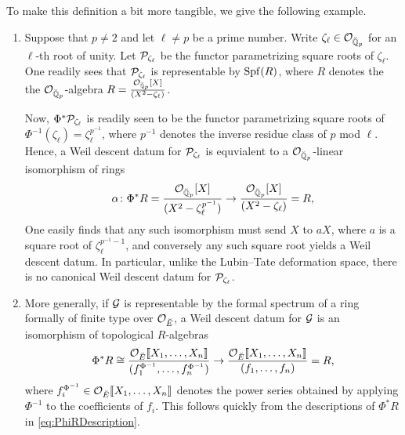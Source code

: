 \documentclass[../main.tex]{subfiles}
\begin{document}
To make this definition a bit more tangible, we give the following example.
\begin{xpl}
  \begin{enumerate}
    \item Suppose that $p \neq 2$ and let $\ell \neq p$ be a prime number. Write 
  $\zeta_\ell \in \mathcal{O}_{{\breve {\mathbb{Q}}}_p}$ for an $\ell$-th root of unity. Let
  $\mathcal{P}_{\zeta_\ell}$ be the functor parametrizing
  square roots of $\zeta_\ell$. One readily sees that $\mathcal{P}_{\zeta_\ell}$ is
  representable by 
  $\operatorname{Spf}(R)$, where $R$ denotes the the $\mathcal{O}_{{\breve {\mathbb{Q}}}_p}$-algebra
  $R = \frac{\mathcal{O}_{{\breve {\mathbb{Q}}}_p}[X]}{(X^2 - \zeta_\ell)}$. 

  Now, $\Phi^*\mathcal{P}_{\zeta_\ell}$ is readily seen to be the functor
  parametrizing square roots of $\Phi^{-1}(\zeta_\ell) = \zeta_\ell^{p^{-1}}$,
  where $p^{-1}$ denotes the inverse residue class of $p$ mod $\ell$. 
  Hence, a Weil descent datum for $\mathcal{P}_{\zeta_\ell}$ is equvialent to a 
  $\mathcal{O}_{{\breve {\mathbb{Q}}}_p}$-linear isomorphism of rings
  \begin{equation*}
    \alpha \colon \Phi^* R = \frac{\mathcal{O}_{{\breve {\mathbb{Q}}}_p}[X]}{(X^2 - \zeta_\ell^{p^{-1}})} \to
    \frac{\mathcal{O}_{{\breve {\mathbb{Q}}}_p}[X]}{(X^2 - \zeta_\ell)} = R, 
  \end{equation*}
  One easily finds that any such isomorphism must send $X$ to $aX$, where $a$
  is a square root of $\zeta_\ell^{p^{-1}-1}$, and conversely any such square
  root yields a Weil descent datum. In particular, unlike the  Lubin--Tate
  deformation space, there is no canonical Weil descent datum for
  $\mathcal{P}_{\zeta_\ell}$. 
    \item More generally, if $\mathcal{G}$ is representable by the formal spectrum of a 
      ring formally of finite type over $\mathcal{O}_{{\breve {E}}}$, a Weil descent datum 
      for $\mathcal{G}$ is an isomorphism of topological $R$-algebras
      \begin{equation*}
        \Phi^* R \cong \frac{ \mathcal{O}_{{\breve {E}}}\llbracket X_1, \dots, X_n \rrbracket}{(f_1^{\Phi^{-1}},
        \dots, f_n^{\Phi^{-1}})}
        \to 
        \frac{ \mathcal{O}_{{\breve {E}}}\llbracket X_1, \dots, X_n \rrbracket}{(f_1, \dots,
        f_n)} = R,
      \end{equation*}
      where $f_i^{\Phi^{-1}} \in \mathcal{O}_{\breve {E}}\llbracket X_1, \dots, X_n\rrbracket$ denotes the 
      power series obtained by applying $\Phi^{-1}$ to the coefficients of $f_i$.
      This follows quickly from the descriptions of $\Phi^*R$ in
      \eqref{eq:PhiRDescription}.
  \end{enumerate}
\end{xpl}
\end{document}
